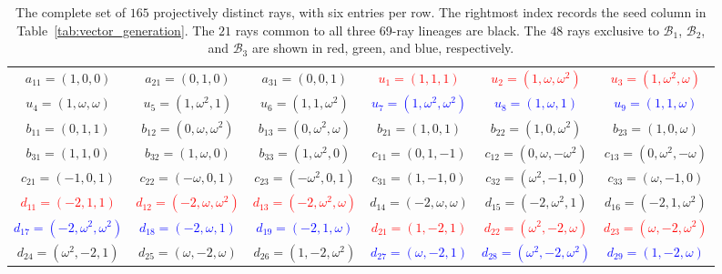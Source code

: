 \documentclass[%
  reprint,
  superscriptaddress,
  showpacs,
  showkeys,
  amsmath,amssymb,
  pra,
  longbibliography,
  floatfix,
  x11names
]{revtex4-2}
\newcommand{\rev}[1]{{\color{revisionblue}#1}}
\begin{document}
\begin{table}[htbp!]
\caption{
\rev{The complete set of $165$ projectively distinct rays, with six entries per row.  The rightmost index records the seed column in Table~\ref{tab:vector_generation}.  The $21$ rays common to all three 69-ray lineages are black.  The $48$ rays exclusive to $\mathcal{B}_1$, $\mathcal{B}_2$, and $\mathcal{B}_3$ are shown in red, green, and blue, respectively.}
}
\label{tab:noncollinear_vectors_6col}
\footnotesize %
\begin{ruledtabular}
\begin{tabular}{*{6}{c}} %
{$a_{11}=(1,0,0)$} & {$a_{21}=(0,1,0)$} & {$a_{31}=(0,0,1)$} & \textcolor{red}{$u_{1}=(1,1,1)$} & \textcolor{red}{$u_{2}=(1,\omega,\omega^2)$} & \textcolor{red}{$u_{3}=(1,\omega^2,\omega)$} \\
\textcolor{green!40!black}{$u_{4}=(1,\omega,\omega)$} & \textcolor{green!40!black}{$u_{5}=(1,\omega^2,1)$} & \textcolor{green!40!black}{$u_{6}=(1,1,\omega^2)$} & \textcolor{blue}{$u_{7}=(1,\omega^2,\omega^2)$} & \textcolor{blue}{$u_{8}=(1,\omega,1)$} & \textcolor{blue}{$u_{9}=(1,1,\omega)$} \\
{$b_{11}=(0,1,1)$} & {$b_{12}=(0,\omega,\omega^2)$} & {$b_{13}=(0,\omega^2,\omega)$} & {$b_{21}=(1,0,1)$} & {$b_{22}=(1,0,\omega^2)$} & {$b_{23}=(1,0,\omega)$} \\
{$b_{31}=(1,1,0)$} & {$b_{32}=(1,\omega,0)$} & {$b_{33}=(1,\omega^2,0)$} & {$c_{11}=(0,1,-1)$} & {$c_{12}=(0,\omega,-\omega^2)$} & {$c_{13}=(0,\omega^2,-\omega)$} \\
{$c_{21}=(-1,0,1)$} & {$c_{22}=(-\omega,0,1)$} & {$c_{23}=(-\omega^2,0,1)$} & {$c_{31}=(1,-1,0)$} & {$c_{32}=(\omega^2,-1,0)$} & {$c_{33}=(\omega,-1,0)$} \\
\textcolor{red}{$d_{11}=(-2,1,1)$} & \textcolor{red}{$d_{12}=(-2,\omega,\omega^2)$} & \textcolor{red}{$d_{13}=(-2,\omega^2,\omega)$} & \textcolor{green!40!black}{$d_{14}=(-2,\omega,\omega)$} & \textcolor{green!40!black}{$d_{15}=(-2,\omega^2,1)$} & \textcolor{green!40!black}{$d_{16}=(-2,1,\omega^2)$} \\
\textcolor{blue}{$d_{17}=(-2,\omega^2,\omega^2)$} & \textcolor{blue}{$d_{18}=(-2,\omega,1)$} & \textcolor{blue}{$d_{19}=(-2,1,\omega)$} & \textcolor{red}{$d_{21}=(1,-2,1)$} & \textcolor{red}{$d_{22}=(\omega^2,-2,\omega)$} & \textcolor{red}{$d_{23}=(\omega,-2,\omega^2)$} \\
\textcolor{green!40!black}{$d_{24}=(\omega^2,-2,1)$} & \textcolor{green!40!black}{$d_{25}=(\omega,-2,\omega)$} & \textcolor{green!40!black}{$d_{26}=(1,-2,\omega^2)$} & \textcolor{blue}{$d_{27}=(\omega,-2,1)$} & \textcolor{blue}{$d_{28}=(\omega^2,-2,\omega^2)$} & \textcolor{blue}{$d_{29}=(1,-2,\omega)$} \\

\end{tabular}
\end{ruledtabular}
\end{table}
\end{document}
